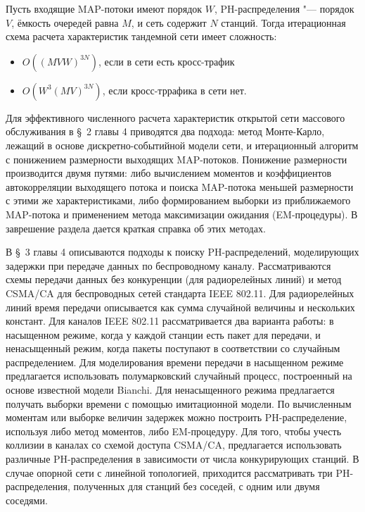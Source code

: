 
\begin{prop}
  Пусть входящие MAP-потоки имеют порядок $W$, PH-распределения "--- порядок $V$, ёмкость очередей равна $M$, и сеть содержит $N$ станций. Тогда итерационная схема расчета характеристик тандемной сети имеет сложность:
  \begin{itemize}
    \item $O((M V W)^{3N})$, если в сети есть кросс-трафик
    \item $O(W^3 (M V)^{3N})$, если кросс-тррафика в сети нет.
  \end{itemize}
\end{prop}

Для эффективного численного расчета характеристик открытой сети массового обслуживания в \S~2 главы 4 приводятся два подхода: метод Монте-Карло, лежащий в основе дискретно-событийной модели сети, и итерационный алгоритм с понижением размерности выходящих MAP-потоков. Понижение размерности производится двумя путями: либо вычислением моментов и коэффициентов автокорреляции выходящего потока и поиска MAP-потока меньшей размерности с этими же характеристиками, либо формированием выборки из приближаемого MAP-потока и применением метода максимизации ожидания (EM-процедуры). В заврешение раздела дается краткая справка об этих методах.

В \S~3 главы 4 описываются подходы к поиску PH-распределений, моделирующих задержки при передаче данных по беспроводному каналу. Рассматриваются схемы передачи данных без конкуренции (для радиорелейных линий) и метод CSMA/CA для беспроводных сетей стандарта IEEE 802.11. Для радиорелейных линий время передачи описывается как сумма случайной величины и нескольких констант. Для каналов IEEE 802.11 рассматривается два варианта работы: в насыщенном режиме, когда у каждой станции есть пакет для передачи, и ненасыщенный режим, когда пакеты поступают в соответствии со случайным распределением. Для моделирования времени передачи в насыщенном режиме предлагается использовать полумарковский случайный процесс, построенный на основе известной модели Bianchi. Для ненасыщенного режима предлагается получать выборки времени с помощью имитационной модели. По вычисленным моментам или выборке величин задержек можно построить PH-распределение, используя либо метод моментов, либо EM-процедуру. Для того, чтобы учесть коллизии в каналах со схемой доступа CSMA/CA, предлагается использовать различные PH-распределения в зависимости от числа конкурирующих станций. В случае опорной сети с линейной топологией, приходится рассматривать три PH-распределения, полученных для станций без соседей, с одним или двумя соседями.

